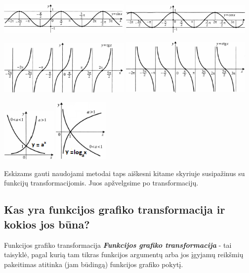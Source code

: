 \documentclass{article}
\begin{document}
\includegraphics[width=0.48\textwidth]{graph_sin.png}
\includegraphics[width=0.48\textwidth]{graph_cos.png}

\includegraphics[width=0.48\textwidth]{graph_tan.png}
\includegraphics[width=0.48\textwidth]{graph_cot.png}

\includegraphics[width=0.2\textwidth]{graph_axsimple.png}
\includegraphics[width=0.2\textwidth]{graph_logsimple.png}

Eskizams gauti naudojami metodai taps aiškesni kitame skyriuje susipažinus su funkcijų transformacijomis. Juos apžvelgsime po transformacijų.
\subsection*{Kas yra funkcijos grafiko transformacija ir kokios jos būna?}
\begin{mybox}{Funkcijos grafiko transformacija}
\textbf{\textit{Funkcijos grafiko transformacija}} - tai taisyklė, pagal kurią tam tikras funkcijos argumentų arba jos įgyjamų reikšmių pakeitimas atitinka (jam būdingą) funkcijos grafiko pokytį.
\end{mybox}
\newcommand{\go}[2]{\hyperlink{#2}{\tikz
\node[rectangle, draw=black, fill=blue!30, rounded corners=.2cm] (#1) {\hypertarget{#1}{\textbf{GO}}};
}}
\end{document}
